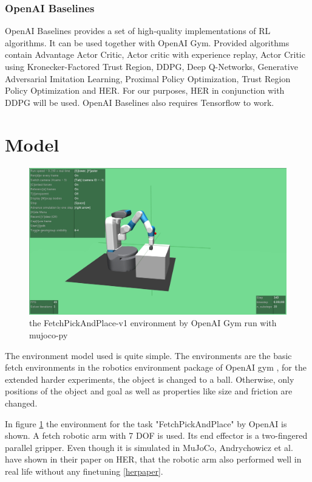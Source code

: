 \subsubsection{OpenAI Baselines}
OpenAI Baselines provides a set of high-quality implementations of RL algorithms. It can be used together with OpenAI Gym. Provided algorithms contain Advantage Actor Critic, Actor critic with experience replay, Actor Critic using Kronecker-Factored Trust Region, DDPG, Deep Q-Networks, Generative Adversarial Imitation Learning, Proximal Policy Optimization, Trust Region Policy Optimization and HER.
For our purposes, HER in conjunction with DDPG will be used. 
OpenAI Baselines also requires Tensorflow to work.

\section{Model}

\begin{figure} [h]
	\centering
	\includegraphics[width=1\textwidth]{figures/FetchPickAndPlace-v1.png}
	\caption{the FetchPickAndPlace-v1 environment by OpenAI Gym run with mujoco-py}
	\label{pickplace1}
\end{figure}

The environment model used is quite simple. The environments are the basic fetch environments in the robotics environment package of OpenAI gym \cite{plappert}, for the extended harder experiments, the object is changed to a ball. Otherwise, only positions of the object and goal as well as properties like size and friction are changed.

\vspace{0.5cm}

In figure \ref{pickplace1} the environment for the task "FetchPickAndPlace" by OpenAI is shown. A fetch robotic arm with 7 DOF is used. Its end effector is a two-fingered parallel gripper. Even though it is simulated in MuJoCo, Andrychowicz et al. have shown in their paper on HER, that the robotic arm also performed well in real life without any finetuning \ref{herpaper}. 

